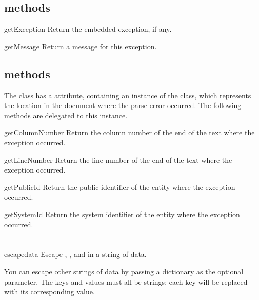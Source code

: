 \documentclass{howto}
\begin{document}
\subsection{ methods}

\begin{methoddesc}{getException}{}
Return the embedded exception, if any.
\end{methoddesc}

\begin{methoddesc}{getMessage}{}
Return a message for this exception.
\end{methoddesc}

\subsection{ methods}

The  class has a 
attribute, containing an instance of the  class, which
represents the location in the document where the parse error
occurred.  The following methods are delegated to this instance.

\begin{methoddesc}{getColumnNumber}{}
Return the column number of the end of the text where the exception
	occurred.
\end{methoddesc}

\begin{methoddesc}{getLineNumber}{}
Return the line number of the end of the text where the exception occurred.
\end{methoddesc}

\begin{methoddesc}{getPublicId}{}
Return the public identifier of the entity where the exception occurred.
\end{methoddesc}

\begin{methoddesc}{getSystemId}{}
Return the system identifier of the entity where the exception occurred.
\end{methoddesc}


\section{}

\begin{funcdesc}{escape}{data}
  Escape \character{\&}, \character{<}, and \character{>} in a string
  of data.

  You can escape other strings of data by passing a dictionary as the
  optional  parameter.  The keys and values must all be
  strings; each key will be replaced with its corresponding value.
\end{funcdesc}
\end{document}
